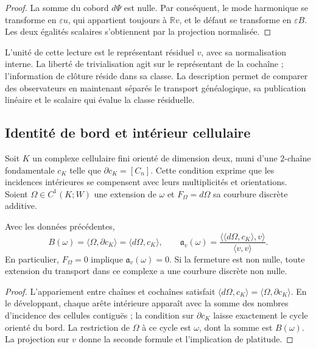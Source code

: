 \begin{proof}
La somme du cobord \(d\Psi\) est nulle. Par conséquent, le mode harmonique
se transforme en \(\varepsilon u\), qui appartient toujours à
\(\mathbb Rv\), et le défaut se transforme en \(\varepsilon B\).
Les deux égalités scalaires s'obtiennent par la projection normalisée.
\end{proof}

L'unité de cette lecture est le représentant résiduel \(v\), avec sa normalisation interne. La liberté de trivialisation agit sur le représentant de la cochaîne ; l'information de clôture réside dans sa classe. La description permet de comparer des observateurs en maintenant séparés le transport généalogique, sa publication linéaire et le scalaire qui évalue la classe résiduelle.

\subsection{Identité de bord et intérieur cellulaire}
\label{vii:vii:sec:observador-stokes}

Soit \(K\) un complexe cellulaire fini orienté de dimension deux,
muni d'une \(2\)-chaîne fondamentale \(c_K\) telle que
\(\partial c_K=[C_n]\). Cette condition exprime que les incidences
intérieures se compensent avec leurs multiplicités et orientations.
Soient \(\Omega\in C^1(K;W)\) une extension de \(\omega\) et
\(F_\Omega=d\Omega\) sa courbure discrète additive.

\begin{theorem}
\label{vii:vii:thm:observador-stokes}
Avec les données précédentes,
\begin{equation}
 B(\omega)=\langle\Omega,\partial c_K\rangle
          =\langle d\Omega,c_K\rangle,
 \qquad
 \mathfrak a_v(\omega)
 =\frac{\langle\langle d\Omega,c_K\rangle,v\rangle}
        {\langle v,v\rangle}.
 \label{vii:vii:eq:observador-stokes}
\end{equation}
En particulier, \(F_\Omega=0\) implique \(\mathfrak a_v(\omega)=0\).
Si la fermeture est non nulle, toute extension du transport dans ce complexe
a une courbure discrète non nulle.
\end{theorem}

\begin{proof}
L'appariement entre chaînes et cochaînes satisfait
\(\langle d\Omega,c_K\rangle=\langle\Omega,\partial c_K\rangle\).
En le développant, chaque arête intérieure apparaît avec la somme des nombres
d'incidence des cellules contiguës ; la condition sur
\(\partial c_K\) laisse exactement le cycle orienté du bord.
La restriction de \(\Omega\) à ce cycle est \(\omega\), dont la somme
est \(B(\omega)\). La projection sur \(v\) donne la seconde formule
et l'implication de platitude.
\end{proof}


